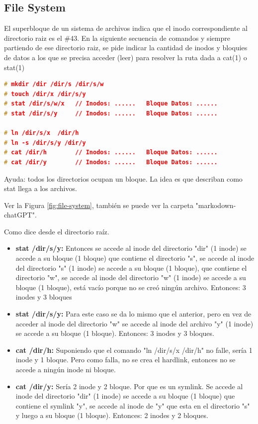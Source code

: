 \documentclass[../main.tex]{subfiles}
\begin{document}
\subsection{File System}
    \begin{exercise}
        El superbloque de un sistema de archivos indica que el inodo correspondiente al directorio raiz es el \#43. En la siguiente secuencia de comandos y siempre partiendo de ese directorio raiz, se pide indicar  la cantidad de inodos y bloquies de datos a los que se precisa acceder (leer) para resolver la ruta dada a cat(1) o stat(1)
        
        \begin{lstlisting}[language=c, caption=hola mundo.]
# mkdir /dir /dir/s /dir/s/w
# touch /dir/x /dir/s/y
# stat /dir/s/w/x   // Inodos: ......   Bloque Datos: ......
# stat /dir/s/y     // Inodos: ......   Bloque Datos: ......

# ln /dir/s/x  /dir/h
# ln -s /dir/s/y /dir/y
# cat /dir/h        // Inodos: ......   Bloque Datos: ......
# cat /dir/y        // Inodos: ......   Bloque Datos: ......
        \end{lstlisting}

        Ayuda: todos los directorios ocupan un bloque. La idea es que describan como stat llega a los archivos.

        \begin{answer}
            Ver la Figura \ref{fig:file-system}, también se puede ver la carpeta "markodown-chatGPT".

            Como dice desde el directorio raíz. 
            \begin{itemize}
                \item \textbf{stat /dir/s/y:} Entonces se accede al inode del directorio "dir" (1 inode) se accede a su bloque (1 bloque) que contiene el directorio "s", se accede al inode del directorio "s" (1 inode) se accede a su bloque (1 bloque), que contiene el directorio "w", se accede al inode del directorio "w" (1 inode) se accede a su bloque (1 bloque), está vacío porque no se creó ningún archivo. Entonces: 3 inodes y 3 bloques
                \item \textbf{stat /dir/s/y:} Para este caso se da lo mismo que el anterior, pero en vez de acceder al inode del directorio "w" se accede al inode del archivo "y" (1 inode) se accede a su bloque (1 bloque). Entonces: 3 inodes y 3 bloques.
                \item \textbf{cat /dir/h:} Suponiendo que el comando "ln /dir/s/x  /dir/h" no falle, sería 1 inode y 1 bloque. Pero como falla, no se crea el hardlink, entonces no se accede a ningún inode ni bloque.
                \item \textbf{cat /dir/y:} Sería 2 inode y 2 bloque. Por que es un symlink. Se accede al inode del directorio "dir" (1 inode) se accede a su bloque (1 bloque) que contiene el symlink "y", se accede al inode de "y" que esta en el directorio "s" y luego a su bloque (1 bloque). Entonces: 2 inodes y 2 bloques.
            \end{itemize}
        \end{answer}
        \label{ex:file-system}
    \end{exercise}
\end{document}
